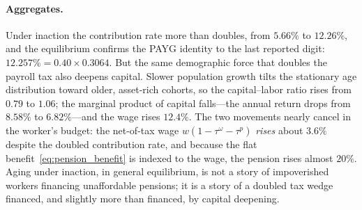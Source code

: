 \documentclass[12pt,a4paper]{article}
\begin{document}
\begin{table}[H]
\end{table}

\paragraph{Aggregates.} Under inaction the contribution rate more than doubles, from $5.66\%$ to $12.26\%$, and the equilibrium confirms the PAYG identity to the last reported digit: $12.257\% = 0.40 \times 0.3064$. But the same demographic force that doubles the payroll tax also deepens capital. Slower population growth tilts the stationary age distribution toward older, asset-rich cohorts, so the capital--labor ratio rises from $0.79$ to $1.06$; the marginal product of capital falls---the annual return drops from $8.58\%$ to $6.82\%$---and the wage rises $12.4\%$. The two movements nearly cancel in the worker's budget: the net-of-tax wage $w(1-\tau^\omega-\tau^p)$ \emph{rises} about $3.6\%$ despite the doubled contribution rate, and because the flat benefit~\eqref{eq:pension_benefit} is indexed to the wage, the pension rises almost $20\%$. Aging under inaction, in general equilibrium, is not a story of impoverished workers financing unaffordable pensions; it is a story of a doubled tax wedge financed, and slightly more than financed, by capital deepening.
\end{document}
